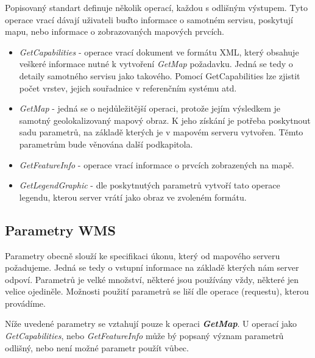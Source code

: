 Popisovaný standart definuje několik operací, každou s odlišným výstupem. Tyto operace vrací dávají uživateli buďto informace o samotném servisu, poskytují mapu, nebo informace o zobrazovaných mapových prvcích.

\begin{itemize}
	\item\textit{GetCapabilities} - operace vrací dokument ve formátu XML, který obsahuje veškeré informace nutné k vytvoření \textit{GetMap} požadavku. Jedná se tedy o detaily samotného servisu jako takového. Pomocí GetCapabilities lze zjistit počet vrstev, jejich souřadnice v referenčním systému atd. 
	
	\item\textit{GetMap} - jedná se o nejdůležitější operaci, protože jejím výsledkem je samotný geolokalizovaný mapový obraz. K jeho získání je potřeba poskytnout sadu parametrů, na základě kterých je v mapovém serveru vytvořen. Těmto parametrům bude věnována další podkapitola. 
	
	\item\textit{GetFeatureInfo} - operace vrací informace o prvcích zobrazených na mapě.
	
	\item\textit{GetLegendGraphic} - dle poskytnutých parametrů vytvoří tato operace legendu, kterou server vrátí jako obraz ve zvoleném formátu.
\end{itemize}

\subsection{Parametry WMS}
Parametry obecně slouží ke specifikaci úkonu, který od mapového serveru požadujeme. Jedná se tedy o vstupní informace na základě kterých nám server odpoví. Parametrů je velké množství, některé jsou používány vždy, některé jen velice ojediněle. Možnosti použití parametrů se liší dle operace (requestu), kterou provádíme. 

Níže uvedené parametry se vztahují pouze k operaci \textbf{\textit{GetMap}}. U operací jako \textit{GetCapabilities}, nebo \textit{GetFeatureInfo} může bý popsaný význam parametrů odlišný, nebo není možné parametr použít vůbec.

